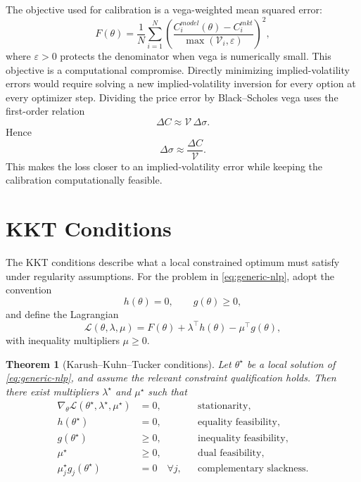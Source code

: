 \documentclass[a4paper,10pt,titlepage,oneside,openany]{book}
\theoremstyle{plain}
\newtheorem{theorem}{Theorem}[chapter]
\theoremstyle{definition}
\theoremstyle{remark}
\newcommand{\vega}{\mathcal{V}}
\newcommand{\Lag}{\mathcal{L}}
\begin{document}
The objective used for calibration is a vega-weighted mean squared error:
\begin{equation}
    F(\theta)
    =
    \frac{1}{N}\sum_{i=1}^N
    \left(
    \frac{C_i^{model}(\theta)-C_i^{mkt}}{\max(\vega_i,\varepsilon)}
    \right)^2,
    \label{eq:vega-weighted-objective}
\end{equation}
where \(\varepsilon>0\) protects the denominator when vega is numerically small. This objective is a computational compromise. Directly minimizing implied-volatility errors would require solving a new implied-volatility inversion for every option at every optimizer step. Dividing the price error by Black--Scholes vega uses the first-order relation
\begin{equation}
    \Delta C \approx \vega \, \Delta\sigma.
\end{equation}
Hence
\begin{equation}
    \Delta\sigma \approx \frac{\Delta C}{\vega}.
\end{equation}
This makes the loss closer to an implied-volatility error while keeping the calibration computationally feasible.

\section{KKT Conditions}

The KKT conditions describe what a local constrained optimum must satisfy under regularity assumptions. For the problem in \eqref{eq:generic-nlp}, adopt the convention
\[
    h(\theta)=0,\qquad g(\theta)\geq0,
\]
and define the Lagrangian
\begin{equation}
    \Lag(\theta,\lambda,\mu)
    =
    F(\theta)
    + \lambda^\top h(\theta)
    - \mu^\top g(\theta),
    \label{eq:lagrangian}
\end{equation}
with inequality multipliers \(\mu\geq0\).

\begin{theorem}[Karush--Kuhn--Tucker conditions]
Let \(\theta^\star\) be a local solution of \eqref{eq:generic-nlp}, and assume the relevant constraint qualification holds. Then there exist multipliers \(\lambda^\star\) and \(\mu^\star\) such that
\begin{align}
    \nabla_\theta \Lag(\theta^\star,\lambda^\star,\mu^\star) &= 0,
    &&\text{stationarity}, \label{eq:kkt-stationarity}\\
    h(\theta^\star) &= 0,
    &&\text{equality feasibility}, \label{eq:kkt-eq}\\
    g(\theta^\star) &\geq 0,
    &&\text{inequality feasibility}, \label{eq:kkt-ineq}\\
    \mu^\star &\geq 0,
    &&\text{dual feasibility}, \label{eq:kkt-dual}\\
    \mu_j^\star g_j(\theta^\star) &= 0\quad\forall j,
    &&\text{complementary slackness}. \label{eq:kkt-comp}
\end{align}
\end{theorem}
\end{document}

